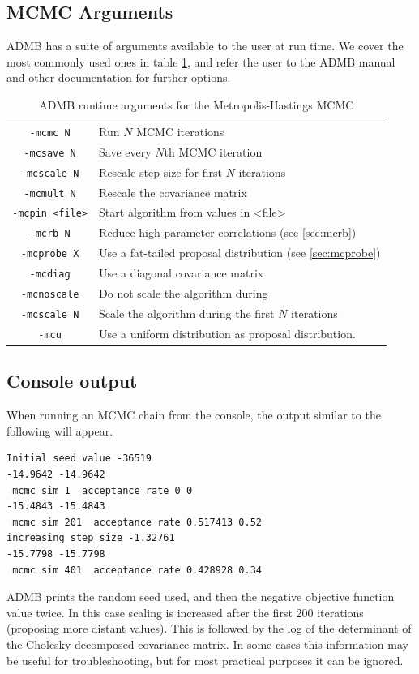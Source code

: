 \documentclass{article}\usepackage[]{graphicx}\usepackage[]{color}
\begin{document}
\subsection{MCMC Arguments}
ADMB has a suite of arguments available to the user at run time. We cover
the most commonly used ones in table \ref{tab:mh_args}, and refer the
user to the ADMB manual and other documentation for further options.
\begin{table}[H]
  \centering
  \begin{tabular}[H]{|cl|}
    \hline
    \texttt{-mcmc N} & Run $N$ MCMC iterations\\
    \texttt{-mcsave N} & Save every $N$th MCMC iteration\\
    \texttt{-mcscale N} & Rescale step size for first $N$ iterations\\
    \texttt{-mcmult N} & Rescale the covariance matrix\\
    \texttt{-mcpin <file>} & Start algorithm from values in <file>\\
    \texttt{-mcrb N} & Reduce high parameter correlations
    (see \ref{sec:mcrb})\\
    \texttt{-mcprobe X} & Use a fat-tailed proposal
    distribution (see \ref{sec:mcprobe})\\
    \texttt{-mcdiag} & Use a diagonal covariance matrix\\
    \texttt{-mcnoscale} & Do not scale the algorithm during\\
    \texttt{-mcscale N} & Scale the algorithm during the
        first $N$ iterations\\
    \texttt{-mcu} & Use a uniform distribution as proposal distribution.\\
    \hline
  \end{tabular}
  \caption{ADMB runtime arguments for the Metropolis-Hastings MCMC}
  \label{tab:mh_args}
\end{table}
\subsection{Console output}
When running an MCMC chain from the console, the output
similar to the following will appear.
\begin{verbatim}
Initial seed value -36519
-14.9642 -14.9642
 mcmc sim 1  acceptance rate 0 0
-15.4843 -15.4843
 mcmc sim 201  acceptance rate 0.517413 0.52
increasing step size -1.32761
-15.7798 -15.7798
 mcmc sim 401  acceptance rate 0.428928 0.34
\end{verbatim}
ADMB prints the random seed used, and then the negative
objective function value twice. In this case scaling is
increased after the first 200 iterations (proposing more
distant values). This is followed by the log of the
determinant of the Cholesky decomposed covariance matrix. In
some cases this information may be useful for
troubleshooting, but for most practical purposes it can be
ignored.
\end{document}
